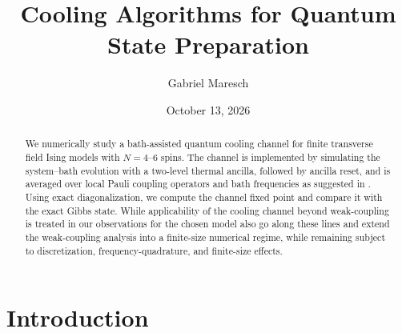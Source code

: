 \documentclass[12pt,a4paper]{article}
\title{Cooling
Algorithms for Quantum State Preparation}
\author{Gabriel Maresch}
\date{October 13, 2026}
\newcommand{\SA}[1]{{\color{orange}{[SA: #1]}}}
\begin{document}
\maketitle
\begin{abstract}
We numerically study a bath-assisted quantum cooling channel for finite transverse field Ising models with $N=4$–$6$ spins. The channel is implemented by simulating the system–bath evolution with a two-level thermal ancilla, followed by ancilla reset, and is averaged over local Pauli coupling operators and bath frequencies as suggested in %
\citet{ding2025}. Using exact diagonalization, we compute the channel fixed point and compare it with the exact Gibbs state. %
%
%
While applicability of the cooling channel beyond weak-coupling is treated in \citet{wang2025} our observations for the chosen model also go along these lines and extend the weak-coupling analysis into a finite-size numerical regime, while remaining subject to discretization, frequency-quadrature, and finite-size effects. 

\end{abstract}
\tableofcontents

\section*{Introduction}
\end{document}
